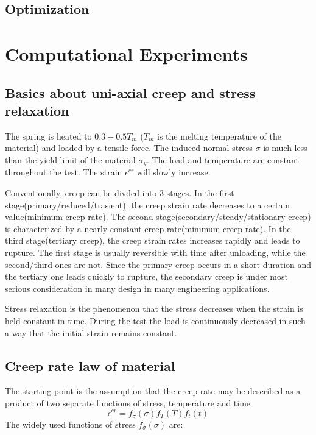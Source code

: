 \documentclass[10pt]{article}
\begin{document}
\subsection{Optimization}
\cite{Derivative} \cite{DirectPaper} \cite{MATLAB:2014a} \cite{DirectUserGuide}
 
 

\section{Computational Experiments}
\subsection{Basics about uni-axial creep and stress relaxation}
The spring is heated to $0.3-0.5T_m$ ($T_m$ is the melting temperature of the material) and loaded by a tensile force. The induced normal stress $\sigma$ is much less than the yield limit of the material $\sigma_y$. The load and temperature are constant throughout the test. The strain $\epsilon^{cr}$ will slowly increase.

Conventionally, creep can be divded into $3$ stages. In the first stage(primary/reduced/trasient) ,the creep strain rate decreases to a certain value(minimum creep rate). The second stage(secondary/steady/stationary creep) is characterized by a nearly constant creep rate(minimum creep rate). In the third stage(tertiary creep), the creep strain rates increases rapidly and leads to rupture. The first stage is usually reversible with time after unloading, while the second/third ones are not. Since the primary creep occurs in a short duration and the tertiary one leads quickly to rupture, the secondary creep is under most serious consideration in many design in many engineering applications.

Stress relaxation is the phenomenon that the stress decreases when the strain is held constant in time. During the test the load is continuously decreased in such a way that the initial strain remains constant.

\subsection{Creep rate law of material}
The starting point is the assumption that the creep rate may be described as a product of two separate functions of stress, temperature and time
\[
\epsilon^{cr}=f_\sigma (\sigma) f_T(T) f_t(t)
\]
The widely used functions of stress $f_\sigma(\sigma)$ are:
\end{document}
